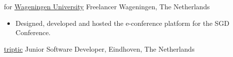 {     
     {for {\color{blue}\href{https://wur.nl/en}{Wageningen University}}}
     {Freelancer}
     {Wageningen, The Netherlands}
     {}{}
     {
     	\begin{itemize}[leftmargin=0.6cm, label={\textbullet}]
     		\item Designed, developed and hosted the e-conference platform  for the SGD Conference.
     	\end{itemize}
     }
      
     {{\color{blue}\href{https://www.triptic.nl/}{triptic}}}
     {Junior Software Developer,}
     {Eindhoven, The Netherlands}
     {}{}
     {
     }
}


